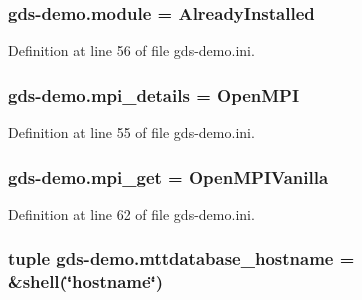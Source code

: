 \hypertarget{namespacegds-demo_afb50f91266d15d79ce91d59cd80b8369}{
\subsubsection[{module}]{\setlength{\rightskip}{0pt plus 5cm}gds-\/demo.\-module = Already\-Installed}}\label{namespacegds-demo_afb50f91266d15d79ce91d59cd80b8369}


Definition at line 56 of file gds-\/demo.\-ini.

\hypertarget{namespacegds-demo_a9dc2cdce477d3c17556857b0fd695d01}{
\subsubsection[{mpi\-\_\-details}]{\setlength{\rightskip}{0pt plus 5cm}gds-\/demo.\-mpi\-\_\-details = Open\-M\-P\-I}}\label{namespacegds-demo_a9dc2cdce477d3c17556857b0fd695d01}


Definition at line 55 of file gds-\/demo.\-ini.

\hypertarget{namespacegds-demo_ae15a0b4fe34cdb90324a9fccefa74d54}{
\subsubsection[{mpi\-\_\-get}]{\setlength{\rightskip}{0pt plus 5cm}gds-\/demo.\-mpi\-\_\-get = Open\-M\-P\-I\-Vanilla}}\label{namespacegds-demo_ae15a0b4fe34cdb90324a9fccefa74d54}


Definition at line 62 of file gds-\/demo.\-ini.

\hypertarget{namespacegds-demo_aa4de05678316043e454babc3bf6f66f8}{
\subsubsection[{mttdatabase\-\_\-hostname}]{\setlength{\rightskip}{0pt plus 5cm}tuple gds-\/demo.\-mttdatabase\-\_\-hostname = \&shell(\char`\"{}hostname\char`\"{})}}\label{namespacegds-demo_aa4de05678316043e454babc3bf6f66f8}


